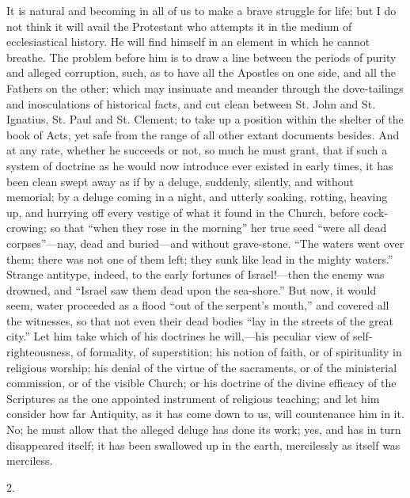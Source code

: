 It is natural and becoming in all of us to make a brave struggle
for life; but I do not think it will avail the Protestant who attempts
it in the medium of ecclesiastical history. He will find himself in an
element in which he cannot breathe. The problem before him is to
draw a line between the periods of purity and alleged corruption,
such, as to have all the Apostles on one side, and all the Fathers on
the other; which may insinuate and meander through the dove-tailings
and inosculations of historical facts, and cut clean between St. John
and St. Ignatius, St. Paul and St. Clement; to take up a position
within the shelter of the book of Acts, yet safe from the range of all
other extant documents besides. And at any rate, whether he succeeds
or not, so much he must grant, that if such a system of doctrine as he
would now introduce ever existed in early times, it has been clean
swept away as if by a deluge, suddenly, silently, and without
memorial; by a deluge coming in a night, and utterly soaking, rotting,
heaving up, and hurrying off every vestige of what it found in the
Church, before cock-crowing; so that ``when they rose in the
morning'' her true seed ``were all dead corpses''—nay,
dead and buried—and without grave-stone. ``The waters went over
them; there was not one of them left; they sunk like lead in the
mighty waters.'' Strange antitype, indeed, to the early fortunes
of Israel!—then the enemy was drowned, and ``Israel saw them
dead upon the sea-shore.'' But now, it would seem, water proceeded
as a flood ``out of the serpent's mouth,'' and covered all the
witnesses, so that not even their dead bodies ``lay in the streets
of the great city.'' Let him take which of his doctrines he will,—his
peculiar view of self-righteousness, of formality, of superstition;
his notion of faith, or of spirituality in religious worship; his
denial of the virtue of the sacraments, or of the ministerial
commission, or of the visible Church; or his doctrine of the divine
efficacy of the Scriptures as the one appointed instrument of
religious teaching; and let him consider how far Antiquity, as
it has come down to us, will countenance him in it. No; he must allow
that the alleged deluge has done its work; yes, and has in turn
disappeared itself; it has been swallowed up in the earth, mercilessly
as itself was merciless.

2.


